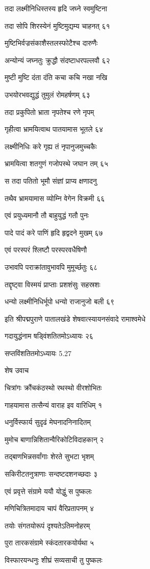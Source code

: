 तदा लक्ष्मीनिधिस्तस्य हृदि जघ्ने स्वमुष्टिना

तदा सोपि शिरस्येनं मुष्टिमुद्यम्य चाहनत् ६१

मुष्टिभिर्वज्रसंकाशैस्तलस्फोटैश्च दारुणैः

अन्योन्यं जघ्नतुः क्रुद्धौ संदष्टाधरपल्लवौ ६२

मुष्टी मुष्टि दंता दंति कचा कचि नखा नखि

उभयोरभवद्युद्धं तुमुलं रोमहर्षणम् ६३

तदा प्रकुपितो भ्राता नृपतेश्च रणे नृपम्

गृहीत्वा भ्रामयित्वाथ पातयामास भूतले ६४

लक्ष्मीनिधिः करे गृह्य तं नृपानुजमुच्चकैः

भ्रामयित्वा शतगुणं गजोपस्थे जघान तम् ६५

स तदा पतितो भूमौ संज्ञां प्राप्य क्षणादनु

तथैव भ्रामयामास व्योम्नि वेगेन विक्रमी ६६

एवं प्रयुध्यमानौ तौ बाहुयुद्धं गतौ पुनः

पादे पादं करे पाणिं हृदि हृद्वदने मुखम् ६७

एवं परस्परं श्लिष्टौ परस्परवधैषिणौ

उभावपि पराक्रांतावुभावपि मुमूर्च्छतुः ६८

तद्दृष्ट्वा विस्मयं प्राप्ताः प्रशशंसुः सहस्रशः

धन्यो लक्ष्मीनिधिर्भूपो धन्यो राजानुजो बली ६९

इति श्रीपद्मपुराणे पातालखंडे शेषवात्स्यायनसंवादे रामाश्वमेधे

गदायुद्धंनाम षड्विंशतितमोऽध्यायः २६

सप्तविंशतितमोऽध्यायः 5.27

शेष उवाच

चित्रांगः क्रौंचकंठस्थो रथस्थो वीरशोभितः

गाहयामास तत्सैन्यं वाराह इव वारिधिम् १

धनुर्विस्फार्य सुदृढं मेघनादनिनादितम्

मुमोच बाणान्निशितान्वैरिकोटिविदाहकान् २

तद्बाणभिन्नसर्वांगाः शेरते सुभटा भृशम्

सकिरीटतनुत्राणाः सन्दष्टदशनच्छदाः ३

एवं प्रवृत्ते संग्रामे ययौ योद्धुं स पुष्कलः

मणिचित्रितमादाय चापं वैरिप्रतापनम् ४

तयोः संगतयोरूपं दृश्यतेऽतिमनोहरम्

पुरा तारकसंग्रामे स्कंदतारकयोर्यथा ५

विस्फारयन्धनुः शीघ्रं सव्यसाची तु पुष्कलः

